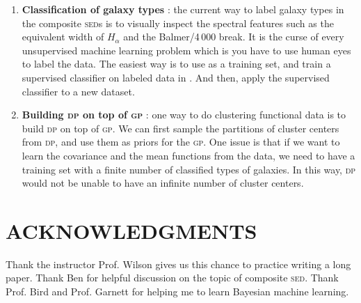 \documentclass{ar-1col}
\begin{document}
\begin{issues}
\begin{enumerate}
    \item {\bf Classification of galaxy types }: the current way to label galaxy types in the composite \textsc{sed}s is to visually inspect the spectral features such as the equivalent width of $H_\alpha$ and the Balmer/4\,000 break. It is the curse of every unsupervised machine learning problem which is you have to use human eyes to label the data. The easiest way is to use \citet{Forrest2018} as a training set, and train a supervised classifier on labeled data in \citet{Forrest2018}. And then, apply the supervised classifier to a new dataset.  
    \item {\bf Building \textsc{dp} on top of \textsc{gp} }: one way to do clustering functional data is to build \textsc{dp} on top of \textsc{gp}. We can first sample the partitions of cluster centers from \textsc{dp}, and use them as priors for the \textsc{gp}. One issue is that if we want to learn the covariance and the mean functions from the data, we need to have a training set with a finite number of classified types of galaxies. In this way, \textsc{dp} would not be unable to have an infinite number of cluster centers.
\end{enumerate}
\end{issues}

 
\section*{ACKNOWLEDGMENTS}

Thank the instructor Prof. Wilson gives us this chance to practice writing a long paper. 
Thank Ben for helpful discussion on the topic of composite \textsc{sed}. 
Thank Prof. Bird and Prof. Garnett for helping me to learn Bayesian machine learning.






\end{document}
